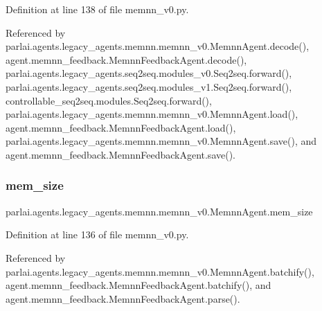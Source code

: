 Definition at line 138 of file memnn\+\_\+v0.\+py.



Referenced by parlai.\+agents.\+legacy\+\_\+agents.\+memnn.\+memnn\+\_\+v0.\+Memnn\+Agent.\+decode(), agent.\+memnn\+\_\+feedback.\+Memnn\+Feedback\+Agent.\+decode(), parlai.\+agents.\+legacy\+\_\+agents.\+seq2seq.\+modules\+\_\+v0.\+Seq2seq.\+forward(), parlai.\+agents.\+legacy\+\_\+agents.\+seq2seq.\+modules\+\_\+v1.\+Seq2seq.\+forward(), controllable\+\_\+seq2seq.\+modules.\+Seq2seq.\+forward(), parlai.\+agents.\+legacy\+\_\+agents.\+memnn.\+memnn\+\_\+v0.\+Memnn\+Agent.\+load(), agent.\+memnn\+\_\+feedback.\+Memnn\+Feedback\+Agent.\+load(), parlai.\+agents.\+legacy\+\_\+agents.\+memnn.\+memnn\+\_\+v0.\+Memnn\+Agent.\+save(), and agent.\+memnn\+\_\+feedback.\+Memnn\+Feedback\+Agent.\+save().

\mbox{\label{classparlai_1_1agents_1_1legacy__agents_1_1memnn_1_1memnn__v0_1_1MemnnAgent_ab21b657cb95a7129d4e0586e537c84c2}} 
\subsubsection{\texorpdfstring{mem\+\_\+size}{mem\_size}}
{\footnotesize\ttfamily parlai.\+agents.\+legacy\+\_\+agents.\+memnn.\+memnn\+\_\+v0.\+Memnn\+Agent.\+mem\+\_\+size}



Definition at line 136 of file memnn\+\_\+v0.\+py.



Referenced by parlai.\+agents.\+legacy\+\_\+agents.\+memnn.\+memnn\+\_\+v0.\+Memnn\+Agent.\+batchify(), agent.\+memnn\+\_\+feedback.\+Memnn\+Feedback\+Agent.\+batchify(), and agent.\+memnn\+\_\+feedback.\+Memnn\+Feedback\+Agent.\+parse().

\mbox{\label{classparlai_1_1agents_1_1legacy__agents_1_1memnn_1_1memnn__v0_1_1MemnnAgent_a6ab848128ba532c6c72bea26f8256e4c}} 
